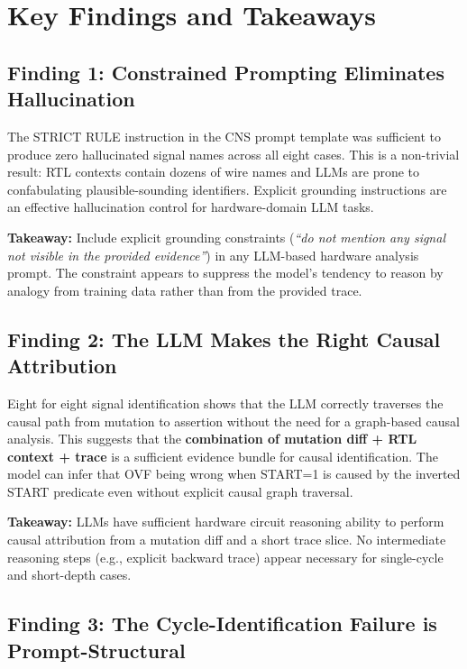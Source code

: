 \documentclass[11pt,a4paper]{article}
\begin{document}
\section{Key Findings and Takeaways}

\subsection{Finding 1: Constrained Prompting Eliminates Hallucination}

The STRICT RULE instruction in the CNS prompt template was sufficient to
produce zero hallucinated signal names across all eight cases. This is a
non-trivial result: RTL contexts contain dozens of wire names and LLMs
are prone to confabulating plausible-sounding identifiers. Explicit grounding
instructions are an effective hallucination control for hardware-domain LLM
tasks.

\textbf{Takeaway:} Include explicit grounding constraints (\emph{``do not
mention any signal not visible in the provided evidence''}) in any
LLM-based hardware analysis prompt. The constraint appears to suppress the
model's tendency to reason by analogy from training data rather than from the
provided trace.

\subsection{Finding 2: The LLM Makes the Right Causal Attribution}

Eight for eight signal identification shows that the LLM correctly traverses
the causal path from mutation to assertion without the need for a graph-based
causal analysis. This suggests that the \textbf{combination of mutation diff +
RTL context + trace} is a sufficient evidence bundle for causal identification.
The model can infer that OVF being wrong when START=1 is caused by the
inverted START predicate even without explicit causal graph traversal.

\textbf{Takeaway:} LLMs have sufficient hardware circuit reasoning ability to
perform causal attribution from a mutation diff and a short trace slice. No
intermediate reasoning steps (e.g., explicit backward trace) appear necessary
for single-cycle and short-depth cases.

\subsection{Finding 3: The Cycle-Identification Failure is Prompt-Structural}
\end{document}
